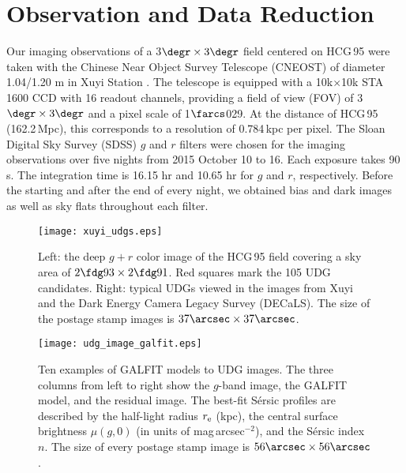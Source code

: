 \documentclass[twocolumn,trackchanges]{aastex61}
\begin{document}
 
\section{Observation and Data Reduction} \label{sec:observe}

Our imaging observations of a 3$\degr \times 3\degr$ field centered on HCG\,95 were taken with the Chinese Near Object Survey Telescope (CNEOST) of diameter 1.04/1.20 m in Xuyi Station \citep{Zhang2013,Zhang2014}. The telescope is equipped with a 10k$\times$10k STA\,1600 CCD with 16 readout channels, providing a field of view (FOV) of 3$\degr \times  3\degr$ and a pixel scale of 1$\farcs$029. At the distance of HCG\,95 (162.2\,Mpc), this corresponds to a resolution of 0.784\,kpc per pixel. The Sloan Digital Sky Survey (SDSS) $g$ and $r$ filters were chosen for the imaging observations over five nights from 2015 October 10 to 16. Each exposure takes 90\,s. The integration time is 16.15 hr and 10.65 hr for $g$ and $r$, respectively.  Before the starting and after the end of every night, we obtained bias and dark images as well as sky flats throughout each filter.

\begin{figure*}
 \begin{center}
  \texttt{[image: xuyi\_udgs.eps]}
  \caption{Left: the deep $g+r$ color image of the HCG\,95 field covering a sky area of $2\fdg93 \times 2\fdg91$. Red squares mark the 105 UDG candidates. Right: typical UDGs viewed in the images from Xuyi and the Dark Energy Camera Legacy Survey (DECaLS). The size of the postage stamp images is $37\arcsec \times 37\arcsec$.}
  \label{fig:fig1}
 \end{center}
\end{figure*}


\begin{figure*}
 \setlength{\abovecaptionskip}{5pt}
 \begin{center}
  \texttt{[image: udg\_image\_galfit.eps]}
  \caption{Ten examples of GALFIT models to UDG images. The three columns from left to right show the $g$-band image, the GALFIT model, and the residual image. The best-fit S{\'e}rsic profiles are described by the half-light radius $r_{\rm e}$ (kpc), the central surface brightness $\mu(g,0)$ (in units of mag\,arcsec$^{-2}$), and the S{\'e}rsic index $n$. The size of every postage stamp image is $56\arcsec \times 56\arcsec$.}
  \label{fig:fig2}
 \end{center}
\end{figure*}
\end{document}
